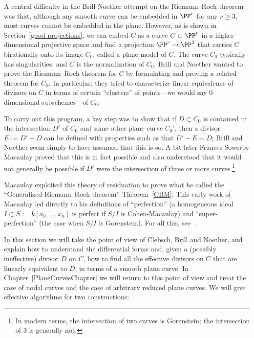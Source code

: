A central difficulty in the Brill-Noether attempt on the Riemann--Roch theorem was that,
although any smooth curve can be embedded in $\PP^r$ for any $r \geq 3$, most curves cannot be embedded in the plane. 
However, as is shown in Section~\ref{good projections}, we can embed $C$ as a curve $ C \subset \PP^r$ in a higher-dimensional projective space and find a projection $\PP^r \to \PP^2$ that carries $C$ birationally onto its image $C_0$, called a plane model of $C$. The curve $C_0$ typically has singularities, and $C$ is the normalization of $C_0$. Brill and Noether wanted to prove the Riemann--Roch theorem for $C$ by formulating and proving a related theorem for $C_0$. In particular, they tried to characterize linear equivalence of divisors on $C$ in terms of certain ``clusters'' of points---we would say 0-dimensional subschemes---of $C_0$. 

To carry out this program, a key step was to show that if $D\subset C_0$ is contained in the intersection
$D'$ of $C_0$ and some other plane curve $C_0'$, then a divisor 
$E := D'-D$ can be defined with properties such as that $D'-E = D$; Brill and Noether seem simply to have assumed that this is so. A bit later Frances Sowerby Macaulay proved that this is in fact possible  and also understood that it would not generally be possible if $D'$ were the intersection of three or more curves.\footnote{In modern terms, the intersection of two curves is Gorenstein; the intersection of 3 is generally not.}

Macaulay exploited this theory of residuation  to prove what he called the ``Generalized Riemann--Roch theorem'' Theorem~\ref{CBM}. This early work of Macaulay led directly to his definitions of  ``perfection'' (a homogeneous ideal
$I  \subset S:= k[x_0, \dots, x_n]$ is perfect if $S/I$ is Cohen-Macaulay) and ``super-perfection'' (the case when $S/I$ is
Gorenstein). For all this, see~\cite{eisenbud-gray}.

In this section we will take the point of view of Clebsch, Brill and Noether, and explain how to understand 
the differential forms and, given a (possibly ineffective) divisor $D$ on $C$, how to find all the 
effective divisors on $C$ that are linearly equivalent to $D$, in terms of a smooth plane curve. In Chapter~\ref{PlaneCurvesChapter} we will return to this point of view and treat the case of
nodal curves and the case of arbitrary reduced plane curves. We will give effective algorithms for
two constructions:


